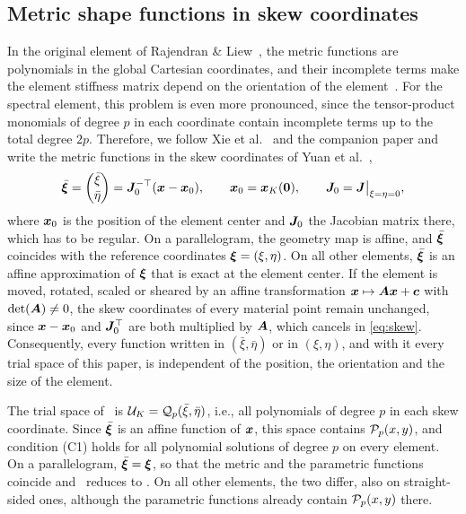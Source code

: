 \subsection{Metric shape functions in skew coordinates}
\label{sec:skew}
%
In the original element of Rajendran \& Liew~\cite{Rajendran2003novel}, the metric functions are polynomials in the global Cartesian coordinates, and their incomplete terms make the element stiffness matrix depend on the orientation of the element~\cite{Ooi2008Remedies}. For the spectral element, this problem is even more pronounced, since the tensor-product monomials of degree $p$ in each coordinate contain incomplete terms up to the total degree $2p$. Therefore, we follow Xie et al.~\cite{Xie2016Modified} and the companion paper and write the metric functions in the skew coordinates of Yuan et al.~\cite{Yuan1993New},
%
\begin{equation}
  \bar{\bm\xi}=\begin{pmatrix}\bar\xi\\\bar\eta\end{pmatrix}=\bm{J}_0^{-\top}(\bm{x}-\bm{x}_0),\qquad
  \bm{x}_0=\bm{x}_K(\bm{0}),\qquad
  \bm{J}_0=\bm{J}\big|_{\xi=\eta=0},
  \label{eq:skew}
\end{equation}
%
where $\bm{x}_0$ is the position of the element center and $\bm{J}_0$ the Jacobian matrix there, which has to be regular. On a parallelogram, the geometry map is affine, and $\bar{\bm\xi}$ coincides with the reference coordinates $\bm\xi=(\xi,\eta)$. On all other elements, $\bar{\bm\xi}$ is an affine approximation of $\bm\xi$ that is exact at the element center. If the element is moved, rotated, scaled or sheared by an affine transformation $\bm{x}\mapsto\bm{A}\bm{x}+\bm{c}$ with $\det(\bm{A})\ne0$, the skew coordinates of every material point remain unchanged, since $\bm{x}-\bm{x}_0$ and $\bm{J}_0^\top$ are both multiplied by $\bm{A}$, which cancels in \cref{eq:skew}. Consequently, every function written in $(\bar\xi,\bar\eta)$ or in $(\xi,\eta)$, and with it every trial space of this paper, is independent of the position, the orientation and the size of the element.

The trial space of \PM\ is $\mathcal U_K=\mathcal Q_p(\bar\xi,\bar\eta)$, i.e., all polynomials of degree $p$ in each skew coordinate. Since $\bar{\bm\xi}$ is an affine function of $\bm{x}$, this space contains $\mathcal P_p(x,y)$, and condition (C1) holds for all polynomial solutions of degree $p$ on every element. On a parallelogram, $\bar{\bm\xi}=\bm\xi$, so that the metric and the parametric functions coincide and \PM\ reduces to \PP. On all other elements, the two differ, also on straight-sided ones, although the parametric functions already contain $\mathcal P_p(x,y)$ there.

